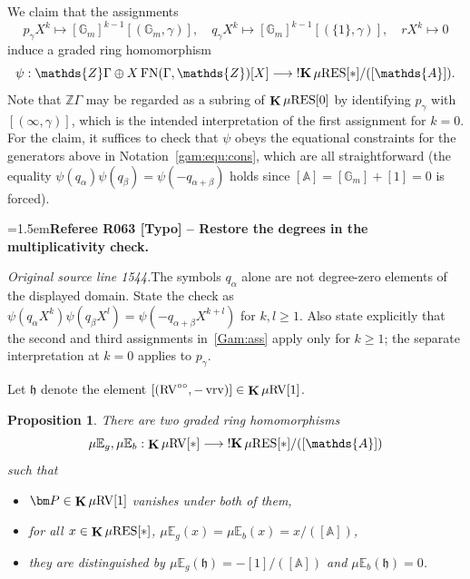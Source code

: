 \documentclass[12pt]{amsart}
\newcommand{\RefereeRemark}[4]{%
  \par\medskip\begingroup\normalfont\small\color{RefereePurple}%
  \emergencystretch=1.5em\noindent\textbf{Referee R#1 [#2] -- #3.}\par\nobreak\noindent #4\par
  \endgroup\medskip
}
\theoremstyle{plain}
\newtheorem{prop}[thm]{Proposition}
\theoremstyle{definition}
\theoremstyle{remark}
\numberwithin{equation}{section}
\theoremstyle{plain}
\newcommand{\RV}{\textup{RV}}
\newcommand{\Z}{\mathds{Z}}
\newcommand{\A}{\mathds{A}}
\newcommand{\G}{\mathds{G}}
\newcommand{\gh}{\mathfrak{h}}
\newcommand{\0}{\emptyset}
\newcommand{\bb}[1]{\mathbb{#1}}
\newcommand{\fun}{\longrightarrow}
\newcommand{\efun}{\longmapsto}
\newcommand{\mgRV}{{\mu}{\RV}}
\newcommand{\RES}{\textup{RES}}
\newcommand{\mgRES}{{\mu}{\RES}}
\newcommand{\mgE}{{\mu}{\bb E}}
\DeclareMathOperator{\ggk}{\mathbf{K}}
\DeclareMathOperator{\sggk}{!\mathbf{K}}
\DeclareMathOperator{\fn}{FN}
\DeclareMathOperator{\vrv}{vrv}
\newcommand{\ccirc}{\circ \circ}
\begin{document}



We claim that the assignments
\begin{equation}\label{Gam:ass}
p_\gamma X^k \efun  [\G_m]^{k-1}[(\G_m, \gamma)], \quad q_\gamma X^k \efun  [\G_m]^{k-1}[(\{1\}, \gamma)], \quad r X^k \efun 0
\end{equation}
induce a graded ring homomorphism
\[
\psi : \Z\Gamma \oplus X\fn(\Gamma, \Z)[X] \fun \sggk \mgRES[*] / ([\A]).
\]
Note that $\Z\Gamma$ may be regarded as a subring of $\ggk \mgRES[0]$ by identifying $p_\gamma$ with $[(\infty, \gamma)]$, which is the intended interpretation of the first assignment for $k = 0$. For the claim, it suffices to check that $\psi$ obeys the equational constraints for the generators above in Notation~\ref{gam:equ:cons}, which are all straightforward (the equality $\psi(q_\alpha) \psi( q_\beta) = \psi(- q_{\alpha + \beta})$ holds since $[\A] = [\G_m] +[1] = 0$ is forced).

\RefereeRemark{063}{Typo}{Restore the degrees in the multiplicativity check}{%
\textit{Original source line 1544.}\quad The symbols $q_\alpha$ alone are not degree-zero elements of the displayed domain. State the check as $\psi(q_\alpha X^k)\psi(q_\beta X^l)=\psi(-q_{\alpha+\beta}X^{k+l})$ for $k,l\geq1$. Also state explicitly that the second and third assignments in~\eqref{Gam:ass} apply only for $k\geq1$; the separate interpretation at $k=0$ applies to $p_\gamma$.
}


Let $\gh$ denote the element $[(\RV^{\ccirc},  -\vrv)] \in \ggk \mgRV[1]$.

\begin{prop}\label{prop:eu:retr:k}
There are two graded ring homomorphisms
\[
  \mgE_{g}, \mgE_{b}: \ggk \mgRV[*] \fun   \sggk \mgRES[*] / ([\A])
\]
such that
\begin{itemize}
  \item $\bm P \in \ggk \mgRV[1]$ vanishes under both of them,
  \item for all $x \in \ggk \mgRES[*]$, $\mgE_{g}(x) = \mgE_{b}(x) = x/([\A])$,
  \item they are distinguished by $\mgE_{g}(\gh) = -[1]/([\A])$ and $\mgE_{b}(\gh) = 0$.
\end{itemize}
\end{prop}
\end{document}
